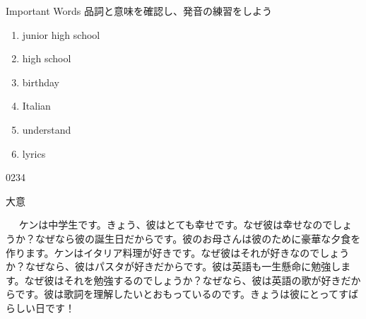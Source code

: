 \documentclass[aspectratio=169,xcolor={dvipsnames,table}]{beamer}
\begin{document}
\begin{frame}[plain]{Important Words}
 品詞と意味を確認し、発音の練習をしよう

\large
\begin{enumerate}
 \item junior high school\hfill{}
 \item high school \hfill{}
 \item birthday \hfill{}
 \item Italian \hfill{}
 \item understand \hfill{}
 \item lyrics \hfill{}
\end{enumerate}

\hfill{\tiny 0234}\,{\scriptsize {}}

\end{frame}
\begin{frame}[plain]{大意}
 
\begin{tcolorbox}[title=なぜケンは幸せなのですか？]
　 ケンは中学生です。きょう、彼はとても幸せです。なぜ彼は幸せなのでしょうか？なぜなら彼の誕生日だからです。彼のお母さんは彼のために豪華な夕食を作ります。ケンはイタリア料理が好きです。なぜ彼はそれが好きなのでしょうか？なぜなら、彼はパスタが好きだからです。彼は英語も一生懸命に勉強します。なぜ彼はそれを勉強するのでしょうか？なぜなら、彼は英語の歌が好きだからです。彼は歌詞を理解したいとおもっているのです。きょうは彼にとってすばらしい日です！
\end{tcolorbox}
\end{frame}
\end{document}
